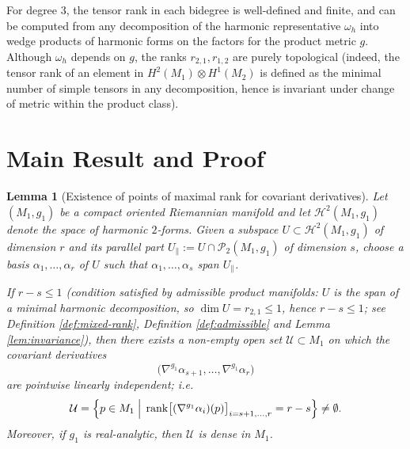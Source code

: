 \documentclass[11pt,reqno]{amsart}
\theoremstyle{plain}
\newtheorem{lemma}[theorem]{Lemma}
\theoremstyle{definition}
\numberwithin{equation}{section}
\begin{document}
For degree \(3\), the tensor rank in each bidegree is well-defined and finite, and can be computed from any decomposition of the harmonic representative \(\omega_h\) into wedge products of harmonic forms on the factors for the product metric \(g\). Although \(\omega_h\) depends on \(g\), the ranks \(r_{2,1}, r_{1,2}\) are purely topological (indeed, the tensor rank of an element in $H^{2}(M_{1})\otimes H^{1}(M_{2})$ is defined as the minimal number of simple tensors in any decomposition, hence is invariant under change of metric within the product class).

\section{Main Result and Proof}

\begin{lemma}[Existence of points of maximal rank for covariant derivatives]\label{lem:maximal-rank-open}
Let \((M_1,g_1)\) be a compact oriented Riemannian manifold and let \(\mathcal{H}^2(M_1,g_1)\) denote the space of harmonic \(2\)-forms.  
Given a subspace \(U\subset\mathcal{H}^2(M_1,g_1)\) of dimension \(r\) and its parallel part \(U_\parallel:=U\cap\mathcal{P}_2(M_1,g_1)\) of dimension \(s\), choose a basis \(\alpha_1,\dots,\alpha_r\) of \(U\) such that \(\alpha_1,\dots,\alpha_s\) span \(U_\parallel\).  


If $r - s \leq 1$ (condition satisfied by admissible product manifolds: $U$ is the span of a minimal harmonic decomposition, 
so $\dim U = r_{2,1} \leq 1$, hence $r - s \leq 1$; see Definition \ref{def:mixed-rank}, Definition \ref{def:admissible} and Lemma \ref{lem:invariance}), then there exists a non-empty open set \(\mathcal{U}\subset M_1\) on which the covariant derivatives 
\[
\bigl(\nabla^{g_1}\alpha_{s+1},\dots,\nabla^{g_1}\alpha_r\bigr)
\]
are pointwise linearly independent; i.e.
\[
\mathcal{U}=\Bigl\{p\in M_1\;\Big|\;
\operatorname{rank}\bigl[(\nabla^{g_1}\alpha_i)(p)\bigr]_{i=s+1,\dots,r}=r-s\Bigr\}\neq\emptyset.
\]
Moreover, if $g_1$ is real-analytic, then $\mathcal{U}$ is dense in $M_1$.
\end{lemma}
\end{document}
